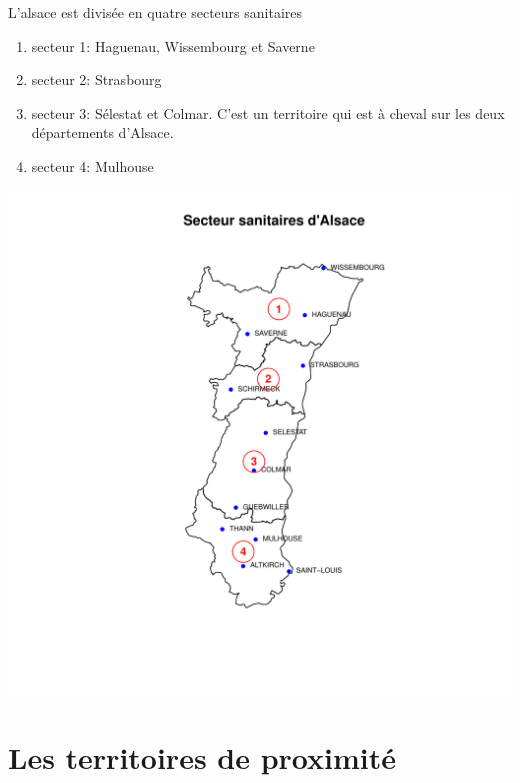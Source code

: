 \documentclass[12pt,english,french,twoside]{report}\usepackage[]{graphicx}\usepackage[]{color}
\makeatletter
\def\maxwidth{ %
  \ifdim\Gin@nat@width>\linewidth
    \linewidth
  \else
    \Gin@nat@width
  \fi
}
\newenvironment{knitrout}{}{} %
\makeatother
\begin{document}
L'alsace est divisée en quatre secteurs sanitaires
\begin{enumerate}
  \item secteur 1: Haguenau, Wissembourg et Saverne
  \item secteur 2: Strasbourg
  \item secteur 3: Sélestat et Colmar. C'est un territoire qui est à cheval sur les deux départements d'Alsace.
  \item secteur 4: Mulhouse
\end{enumerate}

\begin{knitrout}
\color{fgcolor}
\includegraphics[width=\maxwidth]{figure/carte_secteurs_sanitaires} 

\end{knitrout}



\section{Les territoires de proximité}
\end{document}
